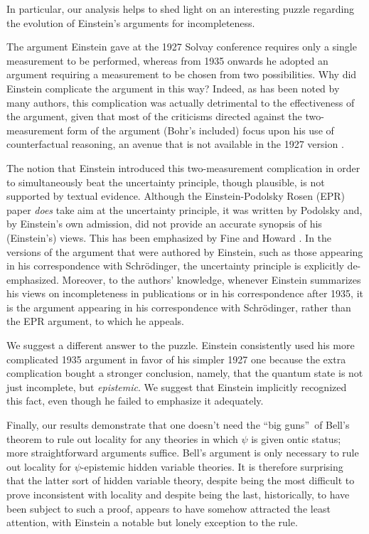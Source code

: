 \documentclass[aps,nofootinbib,12pt]{revtex4-2}
\begin{document}
In particular, our analysis helps to shed light on an interesting
puzzle regarding the evolution of Einstein's arguments for
incompleteness.


The argument Einstein gave at the 1927 Solvay conference requires
only a single measurement to be performed, whereas from 1935 onwards
he adopted an argument requiring a measurement to be chosen from two
possibilities. Why did Einstein complicate the argument in this way?
Indeed, as has been noted by many authors, this complication was
actually detrimental to the effectiveness of the argument, given
that most of the criticisms directed against the two-measurement
form of the argument (Bohr's included) focus upon his use of
counterfactual reasoning, an avenue that is not available in the
1927 version \cite{Hardy1995,Redhead,Fine,Maudlin,norsenboxes}.

The notion that Einstein introduced this two-measurement
complication in order to simultaneously beat the uncertainty
principle, though plausible, is not supported by textual evidence.
Although the Einstein-Podolsky Rosen (EPR) paper \emph{does} take
aim at the uncertainty principle, it was written by Podolsky and, by
Einstein's own admission, did not provide an accurate synopsis of
his (Einstein's) views. This has been emphasized by Fine
\cite{FineEcritique} and Howard \cite{Howard_einstnotepr}. In the
versions of the argument that were authored by Einstein, such as
those appearing in his correspondence with Schr\"{o}dinger, the
uncertainty principle is explicitly de-emphasized. Moreover, to the
authors' knowledge, whenever Einstein summarizes his views on
incompleteness in publications or in his correspondence after 1935,
it is the argument appearing in his correspondence with
Schr\"{o}dinger, rather than the EPR argument, to which he appeals.

We suggest a different answer to the puzzle. Einstein consistently
used his more complicated 1935 argument in favor of his simpler 1927
one because the extra complication bought a stronger conclusion,
namely, that the quantum state is not just incomplete, but
\textit{epistemic}. We suggest that Einstein implicitly recognized
this fact, even though he failed to emphasize it adequately.

Finally, our results demonstrate that one doesn't need the
\textquotedblleft big guns\textquotedblright\ of Bell's theorem
\cite{Bell_locality} to rule out locality for any theories in which
$\psi$ is given ontic status; more straightforward arguments
suffice. Bell's argument is only necessary to rule out locality for
$\psi$-epistemic hidden variable theories. It is therefore
surprising that the latter sort of hidden variable theory, despite
being the most difficult to prove inconsistent with locality and
despite being the last, historically, to have been subject to such a
proof, appears to have somehow attracted the least attention, with
Einstein a notable but lonely exception to the rule.
\end{document}
